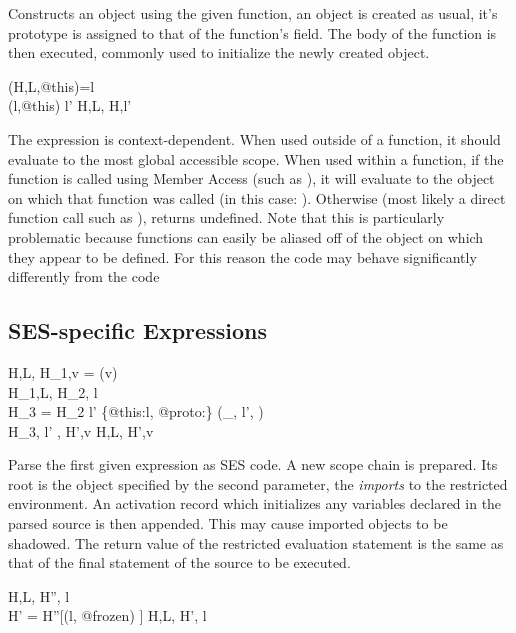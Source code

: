 \documentclass[a4paper,notitlepage]{report}
\begin{document}
Constructs an object using the given function, an object
is created as usual, it's prototype is assigned to that of the function's
 field. The body of the function is then executed, commonly used
to initialize the newly created object.

  {\scope(H,L,@this)=l \\
   (l,@this) \pointsto l'}
  {H,L, \evalsto H,l'}

The  expression is context-dependent. When used
outside of a
function, it should evaluate to the most global accessible scope.
When used within a function, if the function is called using Member Access (such
as ), it
will evaluate to the object on which that function was called (in this case: ). Otherwise
(most likely a direct function call such as ),
 returns undefined. Note that this is particularly
problematic because functions can easily be aliased off of the object on which
they appear to be defined. For this reason the code 
may behave significantly differently from the code 

  \subsection{SES-specific Expressions}

  {H,L, \gevalsto H_1,v \qquad
    = \parse(v) \\
   H_1,L, \gevalsto H_2, l \\
   H_3 = H_2 \disju l' \pointsto \{@this:l, @proto:\nil\} \disju
     (\_, l', ) \\
   H_3, l' \cons [l],  \gevalsto H',v }
  {H,L, \evalsto H',v}

Parse the first given expression as SES code.
A new scope chain is prepared. Its root is the
object specified by the second parameter, the \emph{imports} to the restricted
environment.
An activation record which initializes any variables declared in the parsed
source is then appended. This may cause imported objects to be shadowed.
The return value of the restricted evaluation statement is the same as that of
the final statement of the source to be executed.

  {H,L, \gevalsto H'', l\\
   H' = H''[(l, @frozen) \pointsto \true]}
  {H,L, \evalsto H', l}
\end{document}
